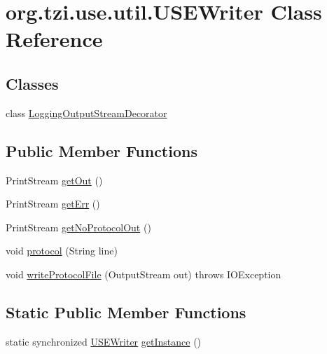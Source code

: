 \hypertarget{classorg_1_1tzi_1_1use_1_1util_1_1_u_s_e_writer}{\section{org.\-tzi.\-use.\-util.\-U\-S\-E\-Writer Class Reference}
\label{classorg_1_1tzi_1_1use_1_1util_1_1_u_s_e_writer}
}
\subsection*{Classes}
\begin{DoxyCompactItemize}
\item 
class \hyperlink{classorg_1_1tzi_1_1use_1_1util_1_1_u_s_e_writer_1_1_logging_output_stream_decorator}{Logging\-Output\-Stream\-Decorator}
\end{DoxyCompactItemize}
\subsection*{Public Member Functions}
\begin{DoxyCompactItemize}
\item 
Print\-Stream \hyperlink{classorg_1_1tzi_1_1use_1_1util_1_1_u_s_e_writer_abe664bfddee1eedc9b7f1f498f9e9238}{get\-Out} ()
\item 
Print\-Stream \hyperlink{classorg_1_1tzi_1_1use_1_1util_1_1_u_s_e_writer_a64c412e56d975343af2e198583e2ebda}{get\-Err} ()
\item 
Print\-Stream \hyperlink{classorg_1_1tzi_1_1use_1_1util_1_1_u_s_e_writer_ad9d407a6e98ad2578473cc9b0a5c8999}{get\-No\-Protocol\-Out} ()
\item 
void \hyperlink{classorg_1_1tzi_1_1use_1_1util_1_1_u_s_e_writer_a2f3417dafffc4d879501b7ee98ac27cd}{protocol} (String line)
\item 
void \hyperlink{classorg_1_1tzi_1_1use_1_1util_1_1_u_s_e_writer_aefe28eebffa66b3b2397d68fa965f8f4}{write\-Protocol\-File} (Output\-Stream out)  throws I\-O\-Exception  
\end{DoxyCompactItemize}
\subsection*{Static Public Member Functions}
\begin{DoxyCompactItemize}
\item 
static synchronized \hyperlink{classorg_1_1tzi_1_1use_1_1util_1_1_u_s_e_writer}{U\-S\-E\-Writer} \hyperlink{classorg_1_1tzi_1_1use_1_1util_1_1_u_s_e_writer_aa6cc325cd10ceab55572e6370cd98d64}{get\-Instance} ()
\end{DoxyCompactItemize}


